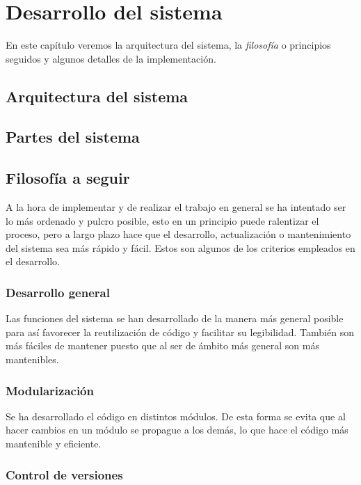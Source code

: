 \chapter{Desarrollo del sistema}

\bigskip
En este capítulo veremos la arquitectura del sistema, la \textit{filosofía} o principios seguidos y algunos detalles de la implementación.


\newpage
\section{Arquitectura del sistema}

\newpage
\section{Partes del sistema}

\newpage
\section{Filosofía a seguir}
\bigskip
A la hora de implementar y de realizar el trabajo en general se ha intentado ser lo más ordenado y pulcro posible, esto en un principio  puede ralentizar el proceso, pero a largo plazo hace que el desarrollo, actualización o mantenimiento del sistema sea más rápido y fácil. Estos son algunos de los criterios empleados en el desarrollo.

\bigskip
\subsection{Desarrollo general}
\bigskip

Las funciones del sistema se han desarrollado de la manera más general posible para así favorecer la reutilización de código y facilitar su legibilidad. También son más fáciles de mantener puesto que al ser de ámbito más general son más mantenibles.

\bigskip
\subsection{Modularización}
\bigskip

Se ha desarrollado el código en distintos módulos. De esta forma se evita que al hacer cambios en un módulo se propague a los demás, lo que hace el código más mantenible y eficiente.

\bigskip
\subsection{Control de versiones}
\bigskip

